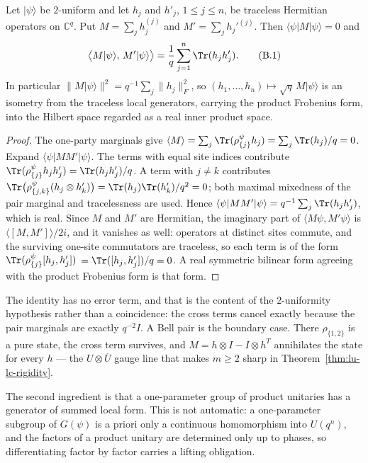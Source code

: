 \AMEFigureFour

\begin{lemma}
\label{lem:local-generator-isometry}
Let \(\lvert\psi\rangle\) be \(2\)-uniform and let \(h_j\) and \(h'_j\),
\(1\leq j\leq n\), be traceless Hermitian operators on \(\mathbb C^q\).
Put \(M=\sum_jh_j^{(j)}\) and \(M'=\sum_jh_j'^{(j)}\).  Then
\(\langle\psi\rvert M\lvert\psi\rangle=0\) and
\[
 \bigl\langle M\lvert\psi\rangle,\,M'\lvert\psi\rangle\bigr\rangle
  =\frac1q\sum_{j=1}^n\Tr(h_jh'_j).                      \tag{B.1}
\]
In particular \(\lVert M\lvert\psi\rangle\rVert^2
 =q^{-1}\sum_j\lVert h_j\rVert_F^2\), so
\((h_1,\ldots,h_n)\mapsto\sqrt q\,M\lvert\psi\rangle\) is an isometry from
the traceless local generators, carrying the product Frobenius form, into
the Hilbert space regarded as a real inner product space.
\end{lemma}

\begin{proof}
The one-party marginals give
\(\langle M\rangle=\sum_j\Tr(\rho^\psi_{\{j\}}h_j)
 =\sum_j\Tr(h_j)/q=0\).  Expand \(\langle\psi\rvert MM'\lvert\psi\rangle\).
The terms with equal site indices contribute
\(\Tr(\rho^\psi_{\{j\}}h_jh'_j)=\Tr(h_jh'_j)/q\).  A term with \(j\ne k\)
contributes
\(\Tr\bigl(\rho^\psi_{\{j,k\}}(h_j\otimes h'_k)\bigr)
 =\Tr(h_j)\Tr(h'_k)/q^2=0\); both maximal mixedness of the pair marginal
and tracelessness are used.  Hence
\(\langle\psi\rvert MM'\lvert\psi\rangle=q^{-1}\sum_j\Tr(h_jh'_j)\), which
is real.  Since \(M\) and \(M'\) are Hermitian, the imaginary part of
\(\langle M\psi,M'\psi\rangle\) is
\(\langle[M,M']\rangle/2i\), and it vanishes as well: operators at distinct
sites commute, and the surviving one-site commutators are traceless, so
each term is of the form \(\Tr(\rho^\psi_{\{j\}}[h_j,h'_j])\)
\(=\Tr([h_j,h'_j])/q=0\).  A real symmetric bilinear form agreeing with
the product Frobenius form is that form.
\end{proof}

The identity has no error term, and that is the content of the
\(2\)-uniformity hypothesis rather than a coincidence: the cross terms
cancel exactly because the pair marginals are exactly \(q^{-2}I\).  A Bell
pair is the boundary case.  There \(\rho_{\{1,2\}}\) is a pure state, the
cross term survives, and \(M=h\otimes I-I\otimes h^{T}\) annihilates the
state for every \(h\) --- the \(U\otimes\overline U\) gauge line that makes
\(m\geq2\) sharp in Theorem~\ref{thm:lu-lc-rigidity}.

The second ingredient is that a one-parameter group of product unitaries
has a generator of summed local form.  This is not automatic: a
one-parameter subgroup of \(G(\psi)\) is a priori only a continuous
homomorphism into \(U(q^n)\), and the factors of a product unitary are
determined only up to phases, so differentiating factor by factor carries a
lifting obligation.

